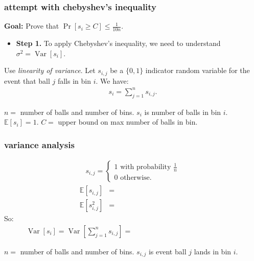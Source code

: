 \documentclass[compress]{beamer}
\newcommand{\E}{\mathbb{E}}
\DeclareMathOperator{\Var}{Var}
\begin{document}
\begin{frame}
	\frametitle{attempt with chebyshev's inequality}
	\textbf{Goal:} Prove that $\Pr[s_i \geq C] \leq \frac{1}{10n}$. 
	\begin{itemize}
		\item \textbf{Step 1.} To apply Chebyshev's inequality, we need to understand $\sigma^2 = \Var[s_i]$. 
	\end{itemize}
	Use \emph{linearity of variance}. Let $s_{i,j}$ be a $\{0,1\}$ indicator random variable for the event that ball $j$ falls in bin $i$. We have:
	\begin{align*}
		s_i = \sum_{j=1}^n s_{i,j}. 
	\end{align*}

	
	\vspace{0em}
	\begin{block}{\vspace*{-3ex}}
		\small $n = $ number of balls and number of bins. $s_i$ is number of balls in bin $i$. $\E[s_i] = 1$. $C =$ upper bound on max number of balls in bin. 
	\end{block}
\end{frame}

\begin{frame}
	\frametitle{variance analysis}

	\begin{align*}
		s_{i,j} = \begin{cases}
			1 \text{ with probability } \frac{1}{n}\\
			0 \text{ otherwise}.
		\end{cases}
	\end{align*}
	\begin{align*}
		\E[s_{i,j}] &= \hspace{10em}\\
		\E[s_{i,j}^2] &=  \hspace{10em}
	\end{align*}
	So:
	\begin{align*}
		\Var[s_i] = \Var\left[\sum_{j=1}^n s_{i,j}\right] = \hspace{15em}
	\end{align*}
	
	\vspace{3em}
	\begin{block}{\vspace*{-3ex}}
		\small $n = $ number of balls and number of bins. $s_{i,j}$ is event ball $j$ lands in bin $i$.
	\end{block}
\end{frame}
\end{document}
